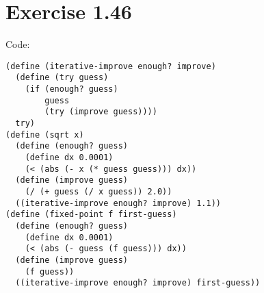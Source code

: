 \documentclass[../main.tex]{subfiles}
\begin{document}
\section{Exercise 1.46}

Code:

\begin{lstlisting}
(define (iterative-improve enough? improve)
  (define (try guess)
    (if (enough? guess)
        guess
        (try (improve guess))))
  try)
(define (sqrt x)
  (define (enough? guess)
    (define dx 0.0001)
    (< (abs (- x (* guess guess))) dx))
  (define (improve guess)
    (/ (+ guess (/ x guess)) 2.0))
  ((iterative-improve enough? improve) 1.1))
(define (fixed-point f first-guess)
  (define (enough? guess)
    (define dx 0.0001)
    (< (abs (- guess (f guess))) dx))
  (define (improve guess)
    (f guess))
  ((iterative-improve enough? improve) first-guess))
\end{lstlisting}
\end{document}
